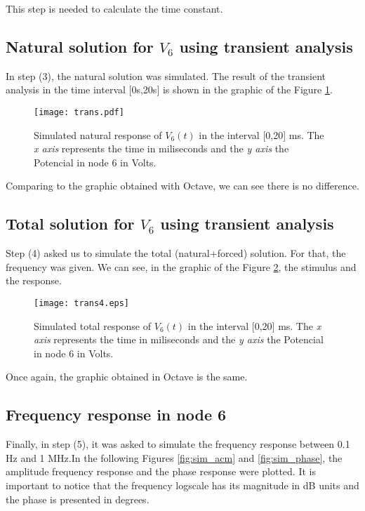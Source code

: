 This step is needed to calculate the time constant.

\subsection{Natural solution for $V_6$ using transient analysis}

In step (3), the natural solution was simulated. The result of the transient analysis in the time interval [0s,20s] is shown in the graphic of the Figure \ref{fig:sim_natural}.

\begin{figure}[H] \centering
\texttt{[image: trans.pdf]}
\caption{Simulated natural response of $V_6(t)$ in the interval [0,20] ms. The \textit{x axis} represents the time in miliseconds and the \textit{y axis} the Potencial in node 6  in Volts.  }
\label{fig:sim_natural}
\end{figure}

Comparing to the graphic obtained with Octave, we can see there is no difference. 

\subsection{Total solution for $V_6$ using transient analysis}

Step (4) asked us to simulate the total (natural+forced) solution. For that, the frequency was given. We can see, in the graphic of the Figure \ref{fig:sim_total}, the stimulus and the response.

\begin{figure}[H] \centering
\texttt{[image: trans4.eps]}
\caption{Simulated total response of $V_6(t)$ in the interval [0,20] ms. The \textit{x axis} represents the time in miliseconds and the \textit{y axis} the Potencial in node 6  in Volts.  }
\label{fig:sim_total}
\end{figure}

Once again, the graphic obtained in Octave is the same.

\subsection{Frequency response in node 6}

Finally, in step (5), it was asked to simulate the frequency response between 0.1 Hz and 1 MHz.In the following Figures \ref{fig:sim_acm} and \ref{fig:sim_phase}, the amplitude frequency response and the phase response were plotted. It is important to notice that the frequency logscale has its magnitude in dB units and the phase is presented in degrees.


